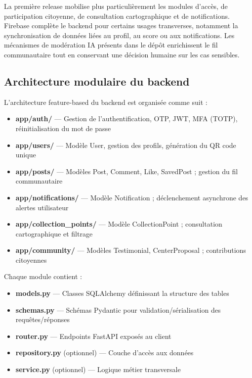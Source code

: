 La première release mobilise plus particulièrement les modules d'accès, de participation citoyenne, de consultation cartographique et de notifications. Firebase complète le backend pour certains usages transverses, notamment la synchronisation de données liées au profil, au score ou aux notifications. Les mécanismes de modération IA présents dans le dépôt enrichissent le fil communautaire tout en conservant une décision humaine sur les cas sensibles.

\subsection{Architecture modulaire du backend}

L'architecture feature-based du backend est organisée comme suit :

\begin{itemize}
    \item \textbf{app/auth/} — Gestion de l'authentification, OTP, JWT, MFA (TOTP), réinitialisation du mot de passe
    \item \textbf{app/users/} — Modèle User, gestion des profils, génération du QR code unique
    \item \textbf{app/posts/} — Modèles Post, Comment, Like, SavedPost ; gestion du fil communautaire
    \item \textbf{app/notifications/} — Modèle Notification ; déclenchement asynchrone des alertes utilisateur
    \item \textbf{app/collection\_points/} — Modèle CollectionPoint ; consultation cartographique et filtrage
    \item \textbf{app/community/} — Modèles Testimonial, CenterProposal ; contributions citoyennes
\end{itemize}

Chaque module contient :
\begin{itemize}
    \item \textbf{models.py} — Classes SQLAlchemy définissant la structure des tables
    \item \textbf{schemas.py} — Schémas Pydantic pour validation/sérialisation des requêtes/réponses
    \item \textbf{router.py} — Endpoints FastAPI exposés au client
    \item \textbf{repository.py} (optionnel) — Couche d'accès aux données
    \item \textbf{service.py} (optionnel) — Logique métier transversale
\end{itemize}

